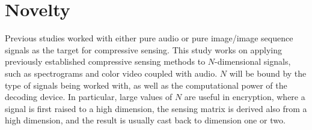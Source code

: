 \section{Novelty}
\label{sec:novel}
Previous studies worked with either pure audio or pure image/image sequence signals as the target for compressive sensing. This study works on applying previously established compressive sensing methods to $N$-dimensional signals, such as spectrograms and color video coupled with audio. $N$ will be bound by the type of signals being worked with, as well as the computational power of the decoding device. In particular, large values of $N$ are useful in encryption, where a signal is first raised to a high dimension, the sensing matrix is derived also from a high dimension, and the result is usually cast back to dimension one or two.